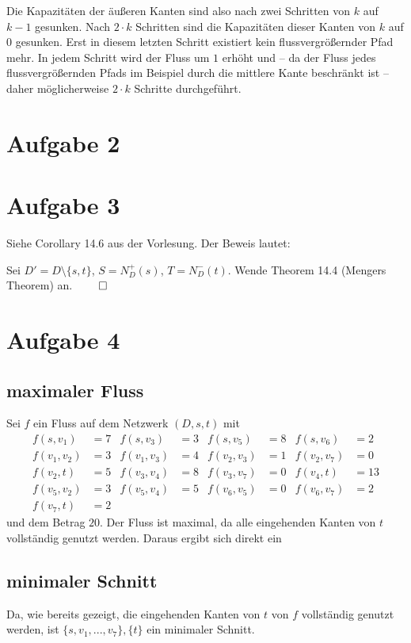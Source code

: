 \documentclass[a4paper]{article}
\begin{document}
Die Kapazitäten der äußeren Kanten sind also nach zwei Schritten von $k$
auf $k-1$ gesunken. Nach $2 \cdot k$ Schritten sind die Kapazitäten dieser
Kanten von $k$ auf $0$ gesunken. Erst in diesem letzten Schritt existiert
kein flussvergrößernder Pfad mehr. In jedem Schritt wird der Fluss um $1$
erhöht und -- da der Fluss jedes flussvergrößernden Pfads im Beispiel durch 
die mittlere Kante beschränkt ist -- daher möglicherweise $2 \cdot k$ Schritte
durchgeführt.

\section{Aufgabe 2}

\section{Aufgabe 3}

Siehe Corollary 14.6 aus der Vorlesung.
Der Beweis lautet:

Sei $D' = D \setminus \{s, t\}$, $S = N^+_D(s)$, $T = N^-_D(t)$.
Wende Theorem 14.4 (Mengers Theorem) an. \hfill{} $\qed$

\section{Aufgabe 4}

\subsection{maximaler Fluss}
Sei $f$ ein Fluss auf dem Netzwerk $(D, s, t)$ mit
\begin{align*}
f(s, v_1) &= 7 		& f(s, v_3) &= 3 	& f(s, v_5) &= 8 	& f(s, v_6) &= 2 \\
f(v_1, v_2) &= 3 	& f(v_1, v_3) &= 4	& f(v_2, v_3) &= 1	& f(v_2, v_7) &= 0 \\
f(v_2, t) &= 5		& f(v_3, v_4) &= 8	& f(v_3, v_7) &= 0	& f(v_4, t) &= 13 \\
f(v_5, v_2) &= 3	& f(v_5, v_4) &= 5	& f(v_6, v_5) &= 0	& f(v_6, v_7) &= 2 \\
f(v_7, t) &= 2
\end{align*}
und dem Betrag $20$. Der Fluss ist maximal, da alle eingehenden Kanten von $t$
vollständig genutzt werden. Daraus ergibt sich direkt ein
\subsection{minimaler Schnitt}
Da, wie bereits gezeigt, die eingehenden Kanten von $t$ von $f$ vollständig
genutzt werden, ist $\{s, v_1, ..., v_7\}, \{t\}$ ein minimaler Schnitt.
\end{document}
